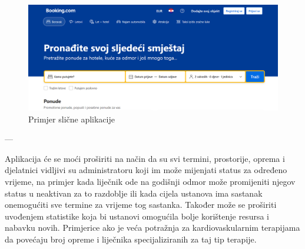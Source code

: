 		\begin{figure}[H]
			\includegraphics[scale=0.4]{slike/slicna_aplikacija.PNG} %
			\centering
			\caption{Primjer slične aplikacije}
			\label{fig:booking}
		\end{figure}
		
		---
		
		Aplikacija će se moći proširiti na način da su svi termini, prostorije, oprema i djelatnici vidljivi su administratoru koji im može mijenjati status za određeno vrijeme, na primjer kada liječnik ode na godišnji odmor može promijeniti njegov status u neaktivan za to razdoblje ili kada cijela ustanova ima sastanak onemogućiti sve termine za vrijeme tog sastanka. Također može se proširiti uvođenjem statistike koja bi ustanovi omogućila bolje korištenje resursa i nabavku novih. Primjerice ako je veća potražnja za kardiovaskularnim terapijama da povećaju broj opreme i liječnika specijaliziranih za taj tip terapije.
		
	
		\eject
		
				
	